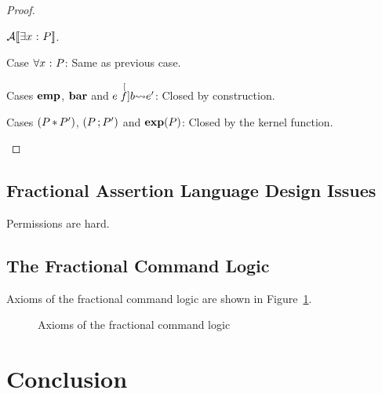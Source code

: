 \documentclass[11pt]{report}
\begin{document}
\begin{proof}
\begin{description}
{			$\mathcal{A}[\![\exists x \operatorname{\,:\,} P]\!]$.
		
		}
		
		\item{Case $\forall x \operatorname{\,:\,} P$:} Same as previous case. 
		
		\item{Cases $\operatorname{\mathbf{emp}}$, $\operatorname{\mathbf{bar}}$ and $e \stackrel[f]{b}{\leadsto} e'$:} Closed by construction.
		
		\item{Cases $(P \operatorname{\ast} P')$, $(P \operatorname{;} P')$ and $\operatorname{\mathbf{exp}}(P)$:} Closed by the kernel function. 
		
	\end{description}
	
\end{proof}



\section{Fractional Assertion Language Design Issues} %
\label{sec:fractional_assertion_language_design_issues}

Permissions are hard. 



\section{The Fractional Command Logic} %
\label{sec:the_command_logic}

Axioms of the fractional command logic are shown in Figure~\ref{fig:fractional-command-logic-axioms}.
\begin{figure}[h]
	\centering
	
		
		\vspace{1em}
	
		
		\vspace{1em}
	
		
		\vspace{1em}
	
		
		
	\caption{Axioms of the fractional command logic}
	\label{fig:fractional-command-logic-axioms}
\end{figure}



\chapter{Conclusion}

 
\end{document}
